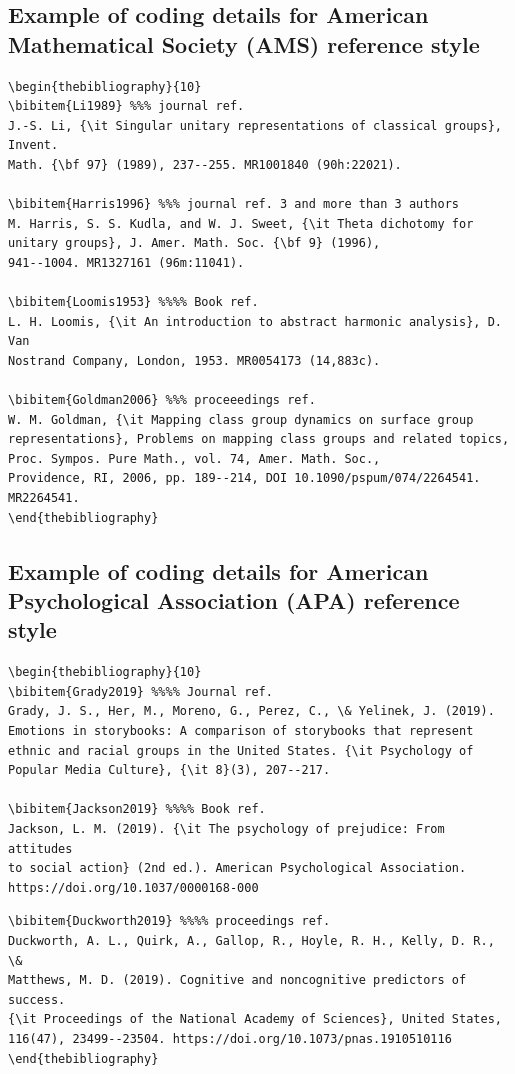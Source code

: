 \documentclass[11pt]{article}
\begin{document}
\subsection{Example of coding details for American Mathematical Society (AMS) reference style}
\begin{verbatim}
\begin{thebibliography}{10}
\bibitem{Li1989} %%% journal ref.
J.-S. Li, {\it Singular unitary representations of classical groups}, Invent.
Math. {\bf 97} (1989), 237--255. MR1001840 (90h:22021).

\bibitem{Harris1996} %%% journal ref. 3 and more than 3 authors
M. Harris, S. S. Kudla, and W. J. Sweet, {\it Theta dichotomy for
unitary groups}, J. Amer. Math. Soc. {\bf 9} (1996),
941--1004. MR1327161 (96m:11041).

\bibitem{Loomis1953} %%%% Book ref.
L. H. Loomis, {\it An introduction to abstract harmonic analysis}, D. Van
Nostrand Company, London, 1953. MR0054173 (14,883c).

\bibitem{Goldman2006} %%% proceeedings ref.
W. M. Goldman, {\it Mapping class group dynamics on surface group
representations}, Problems on mapping class groups and related topics,
Proc. Sympos. Pure Math., vol. 74, Amer. Math. Soc.,
Providence, RI, 2006, pp. 189--214, DOI 10.1090/pspum/074/2264541. MR2264541.
\end{thebibliography}
\end{verbatim}


\subsection{Example of coding details for American Psychological Association (APA) reference style}
\begin{verbatim}
\begin{thebibliography}{10}
\bibitem{Grady2019} %%%% Journal ref.
Grady, J. S., Her, M., Moreno, G., Perez, C., \& Yelinek, J. (2019).
Emotions in storybooks: A comparison of storybooks that represent
ethnic and racial groups in the United States. {\it Psychology of
Popular Media Culture}, {\it 8}(3), 207--217.

\bibitem{Jackson2019} %%%% Book ref.
Jackson, L. M. (2019). {\it The psychology of prejudice: From attitudes
to social action} (2nd ed.). American Psychological Association.
https://doi.org/10.1037/0000168-000
\end{verbatim}


\begin{verbatim}
\bibitem{Duckworth2019} %%%% proceedings ref.
Duckworth, A. L., Quirk, A., Gallop, R., Hoyle, R. H., Kelly, D. R., \&
Matthews, M. D. (2019). Cognitive and noncognitive predictors of success.
{\it Proceedings of the National Academy of Sciences}, United States,
116(47), 23499--23504. https://doi.org/10.1073/pnas.1910510116
\end{thebibliography}
\end{verbatim}
\end{document}

